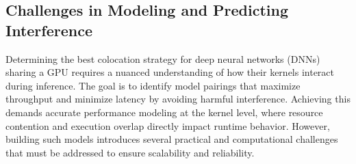 \subsection{Challenges in Modeling and Predicting Interference}


Determining the best colocation strategy for deep neural networks (DNNs) sharing a GPU requires a nuanced understanding of how their kernels interact during inference. The goal is to identify model pairings that maximize throughput and minimize latency by avoiding harmful interference. Achieving this demands accurate performance modeling at the kernel level, where resource contention and execution overlap directly impact runtime behavior. However, building such models introduces several practical and computational challenges that must be addressed to ensure scalability and reliability.

